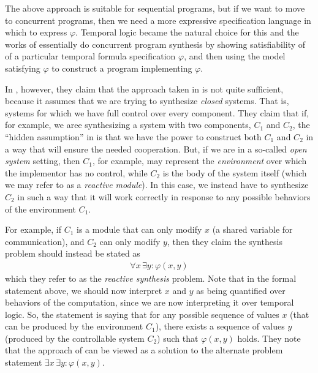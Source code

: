 \documentclass[10pt,a4paper]{article}
\begin{document}
The above approach is suitable for sequential programs, but if we want to move to concurrent programs, then we need a more expressive specification language in which to express $\varphi$. Temporal logic became the natural choice for this and the works of \cite{1981clarkemerson, 1984mannawolper} essentially do concurrent program synthesis by showing satisfiability of of a particular temporal formula specification $\varphi$, and then using the model satisfying $\varphi$ to construct a program implementing $\varphi$.

In \cite{1989pnuelirosner}, however, they claim that the approach taken in \cite{1981clarkemerson, 1984mannawolper} is not quite sufficient, because it assumes that we are trying to synthesize \textit{closed} systems. That is, systems for which we have full control over every component. They claim that if, for example, we aree synthesizing a system with two components, $C_1$ and $C_2$, the ``hidden assumption'' in \cite{1981clarkemerson} is that we have the power to construct both $C_1$ and $C_2$ in a way that will ensure the needed cooperation. But, if we are in a so-called \textit{open system} setting, then $C_1$, for example, may represent the \textit{environment} over which the implementor has no control, while $C_2$ is the body of the system itself (which we may refer to as a \textit{reactive module}). In this case, we instead have to synthesize $C_2$ in such a way that it will work correctly in response to any possible behaviors of the environment $C_1$. 

For example, if $C_1$ is a module that can only modify $x$ (a shared variable for communication), and $C_2$ can only modify $y$, then they claim the synthesis problem should instead be stated as
\begin{align*}
    \forall x \, \exists y : \varphi(x,y)
\end{align*}
which they refer to as the \textit{reactive synthesis} problem. Note that in the formal statement above, we should now interpret $x$ and $y$ as being quantified over behaviors of the computation, since we are now interpreting it over temporal logic. So, the statement is saying that for any possible sequence of values $x$ (that can be produced by the environment $C_1$), there exists a sequence of values $y$ (produced by the controllable system $C_2$) such that $\varphi(x,y)$ holds. They note that the approach of \cite{1981clarkemerson} can be viewed as a solution to the alternate problem statement $\exists x \, \exists y : \varphi(x,y)$.
\end{document}
